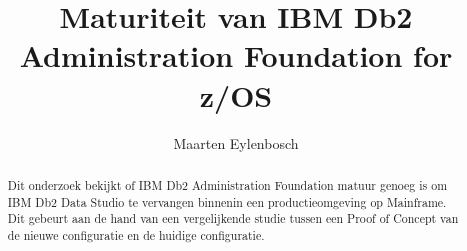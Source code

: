 \documentclass{hogent-article}
\title{Maturiteit van IBM Db2 Administration Foundation for z/OS}
\author{Maarten Eylenbosch}
\begin{document}
\begin{abstract}
Dit onderzoek bekijkt of IBM Db2 Administration Foundation matuur genoeg is om IBM Db2 Data Studio te vervangen binnenin een productieomgeving op Mainframe. Dit gebeurt aan de hand van een vergelijkende studie tussen een Proof of Concept van de nieuwe configuratie en de huidige configuratie. 
\end{abstract}

\tableofcontents



\printbibliography[heading=bibintoc]
\end{document}
